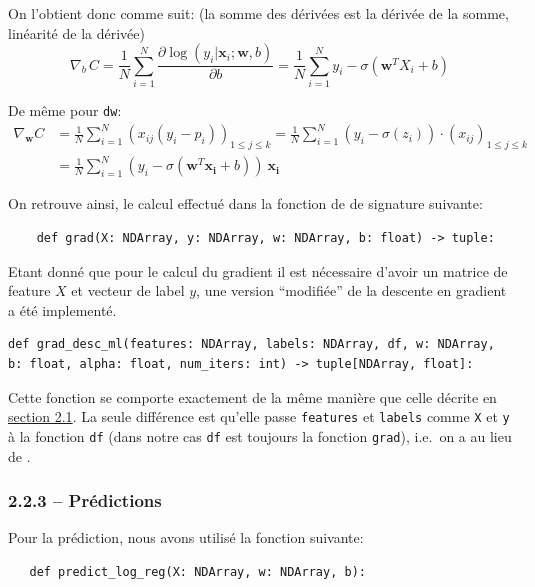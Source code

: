 \documentclass[
]{article}
\begin{document}
On l'obtient donc comme suit: (la somme des dérivées est la dérivée de
la somme, linéarité de la dérivée)
\[\nabla_b\, {C} =\frac{1}{N} \sum_{i = 1}^{N}{ \frac{\partial \log(y_i|\mathbf{x}_i ; \mathbf{w}, b)}{\partial b} =  \frac{1}{N} \sum_{i=1}^N{y_i - \sigma(\mathbf{w}^T X_i + b)}}\]

De même pour \texttt{dw}: \begin{align*}
  \nabla_{\mathbf{w}} C & = \frac{1}{N} \sum_{i = 1}^{N}(x_{ij}(y_i - p_i))_{1 \leq j \leq k} 
  = \frac{1}{N} \sum_{i=1}^N(y_i - \sigma(z_i))\cdot (x_{ij})_{1 \leq j\leq k} \\
%
& =\frac{1}{N}\sum_{i = 1}^N (y_i - \sigma(\mathbf{w}^T\mathbf{x_i} + b))\ \mathbf{x_i}
\end{align*}

On retrouve ainsi, le calcul effectué dans la fonction  de
 de signature suivante:

\begin{lstlisting}
    def grad(X: NDArray, y: NDArray, w: NDArray, b: float) -> tuple:
\end{lstlisting}

Etant donné que pour le calcul du gradient il est nécessaire d'avoir un
matrice de feature \(X\) et vecteur de label \(y\), une version
``modifiée'' de la descente en gradient a été implementé.

\begin{lstlisting}
def grad_desc_ml(features: NDArray, labels: NDArray, df, w: NDArray, b: float, alpha: float, num_iters: int) -> tuple[NDArray, float]:
\end{lstlisting}

Cette fonction se comporte exactement de la même manière que celle
décrite en \href{#gradient-descent}{section 2.1}. La seule différence
est qu'elle passe \texttt{features} et \texttt{labels} comme \texttt{X}
et \texttt{y} à la fonction \texttt{df} (dans notre cas \texttt{df} est
toujours la fonction \texttt{grad}), i.e.~on a
 au lieu de .

\subsubsection{2.2.3 -- Prédictions}\label{pruxe9dictions}

Pour la prédiction, nous avons utilisé la fonction suivante:

\begin{lstlisting}
   def predict_log_reg(X: NDArray, w: NDArray, b):
\end{lstlisting}
\end{document}
